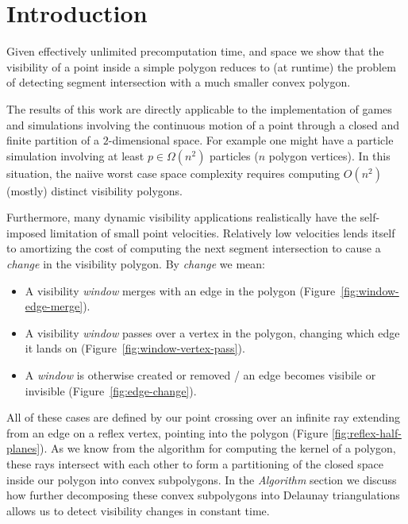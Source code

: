 \section{Introduction} \label{sec:intro}

Given effectively unlimited precomputation time, and space we show
that the visibility of a point inside a simple polygon reduces to
(at runtime) the problem of detecting segment intersection with a
much smaller convex polygon.

The results of this work are directly applicable to the implementation
of games and simulations involving the continuous motion of a point
through a closed and finite partition of a $2$-dimensional space.
For example one might have a particle simulation involving at least
$p \in \Omega(n^2)$ particles ($n$ polygon vertices). In this situation,
the naiive worst case space complexity requires computing $O(n^2)$
(mostly) distinct visibility polygons.

Furthermore, many dynamic visibility applications realistically have
the self-imposed limitation of small point velocities. Relatively
low velocities lends itself to amortizing the cost of computing the
next segment intersection to cause a \emph{change} in the visibility
polygon. By \emph{change} we mean:

\begin{itemize}
\item A visibility \emph{window} merges with an edge in the polygon
(Figure~\ref{fig:window-edge-merge}).
\item A visibility \emph{window} passes over a vertex in the polygon,
changing which edge it lands on (Figure~\ref{fig:window-vertex-pass}).
\item A \emph{window} is otherwise created or removed / an edge becomes
visibile or invisible (Figure~\ref{fig:edge-change}).
\end{itemize}

All of these cases are defined by our point crossing over an infinite ray
extending from an edge on a reflex vertex, pointing into the polygon
(Figure \ref{fig:reflex-half-planes}). As we know from the algorithm
for computing the kernel of a polygon, these rays intersect with each
other to form a partitioning of the closed space inside our polygon
into convex subpolygons. In the \emph{Algorithm} section we discuss how
further decomposing these convex subpolygons into Delaunay triangulations
allows us to detect visibility changes in constant time.

